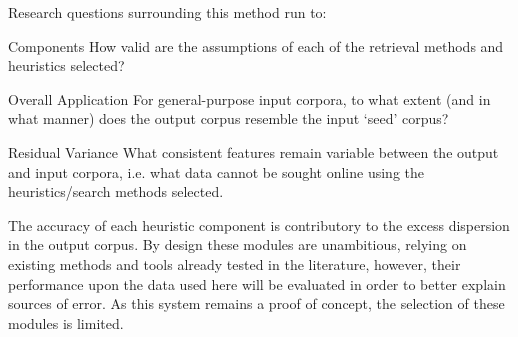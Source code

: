 Research questions surrounding this method run to:

\begin{itemizeTitle}

    \item[Components] How valid are the assumptions of each of the retrieval methods and heuristics selected?

    \item[Overall Application] For general-purpose input corpora, to what extent (and in what manner) does the output corpus resemble the input `seed' corpus?


    \item[Residual Variance] What consistent features remain variable between the output and input corpora, i.e. what data cannot be sought online using the heuristics/search methods selected.

\end{itemizeTitle}

The accuracy of each heuristic component is contributory to the excess dispersion in the output corpus.  By design these modules are unambitious, relying on existing methods and tools already tested in the literature, however, their performance upon the data used here will be evaluated in order to better explain sources of error.  As this system remains a proof of concept, the selection of these modules is limited.

